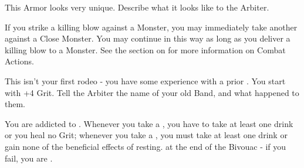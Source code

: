 \begin{multicols*}{2}
    This Armor looks very unique. Describe what it looks like to the Arbiter.

\cbreak


    If you strike a killing blow against a Monster, you may immediately take another  against a Close Monster. You may continue in this way as long as you deliver a killing blow to a Monster. See the section on  for more information on Combat Actions.


    This isn't your first rodeo - you have some experience with a prior . You start with +4 Grit. Tell the Arbiter the name of your old Band, and what happened to them.








    \begin{center}
    \end{center}



    You are addicted to . Whenever you take a , you have to take at least one drink or you heal no Grit; whenever you take a , you must take at least one drink or gain none of the beneficial effects of resting. \RSTRY{\VIG} at the end of the Bivouac - if you fail, you are .


\end{multicols*}
